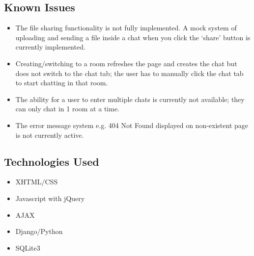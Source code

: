 \documentclass{sig-alt-release2}
\begin{document}
\subsection{Known Issues}
\begin{itemize}
\item The file sharing functionality is not fully implemented. A mock system of uploading and sending a file inside a chat when you click the `share' button is currently implemented.
\item Creating/switching to a room refreshes the page and creates the chat but does not switch to the chat tab; the user has to manually click the chat tab to start chatting in that room.
\item The ability for a user to enter multiple chats is currently not available; they can only chat in 1 room at a time.
\item The error message system e.g. 404 Not Found displayed on non-existent page is not currently active.
\end{itemize}

\subsection{Technologies Used}
\begin{itemize}
\item XHTML/CSS
\item Javascript with jQuery
\item AJAX
\item Django/Python
\item SQLite3

\end{itemize}

\end{document}
